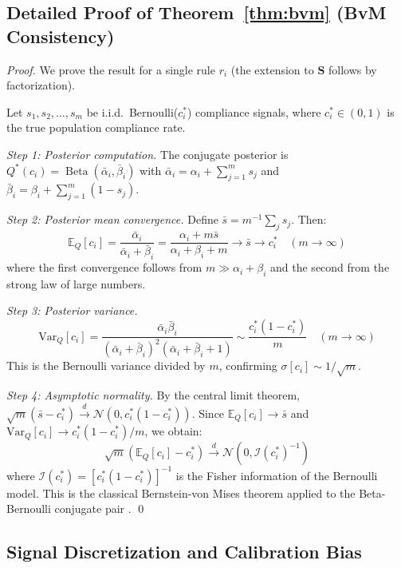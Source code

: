 \subsection{Detailed Proof of Theorem~\ref{thm:bvm} (BvM Consistency)}

\begin{proof}
We prove the result for a single rule $r_i$ (the extension to
$\mathbf{S}$ follows by factorization).

Let $s_1, s_2, \ldots, s_m$ be i.i.d.\ Bernoulli($c_i^*$) compliance
signals, where $c_i^* \in (0,1)$ is the true population compliance rate.

\textit{Step 1: Posterior computation.}
The conjugate posterior is
$Q^*(c_i) = \operatorname{Beta}(\bar{\alpha}_i, \bar{\beta}_i)$ with
$\bar{\alpha}_i = \alpha_i + \sum_{j=1}^m s_j$ and
$\bar{\beta}_i = \beta_i + \sum_{j=1}^m (1-s_j)$.

\textit{Step 2: Posterior mean convergence.}
Define $\bar{s} = m^{-1}\sum_j s_j$. Then:
\[
  \mathbb{E}_Q[c_i] = \frac{\bar{\alpha}_i}{\bar{\alpha}_i + \bar{\beta}_i}
  = \frac{\alpha_i + m\bar{s}}{\alpha_i + \beta_i + m}
  \to \bar{s} \to c_i^* \quad (m \to \infty)
\]
where the first convergence follows from $m \gg \alpha_i + \beta_i$
and the second from the strong law of large numbers.

\textit{Step 3: Posterior variance.}
\[
  \mathrm{Var}_Q[c_i] = \frac{\bar{\alpha}_i \bar{\beta}_i}
  {(\bar{\alpha}_i + \bar{\beta}_i)^2 (\bar{\alpha}_i + \bar{\beta}_i + 1)}
  \sim \frac{c_i^*(1-c_i^*)}{m} \quad (m \to \infty)
\]
This is the Bernoulli variance divided by $m$, confirming
$\sigma[c_i] \sim 1/\sqrt{m}$.

\textit{Step 4: Asymptotic normality.}
By the central limit theorem, $\sqrt{m}(\bar{s} - c_i^*)
\xrightarrow{d} \mathcal{N}(0, c_i^*(1-c_i^*))$. Since
$\mathbb{E}_Q[c_i] \to \bar{s}$ and $\mathrm{Var}_Q[c_i] \to
c_i^*(1-c_i^*)/m$, we obtain:
\[
  \sqrt{m}(\mathbb{E}_Q[c_i] - c_i^*) \xrightarrow{d}
  \mathcal{N}(0, \mathcal{I}(c_i^*)^{-1})
\]
where $\mathcal{I}(c_i^*) = [c_i^*(1-c_i^*)]^{-1}$ is the Fisher
information of the Bernoulli model. This is the classical
Bernstein-von Mises theorem applied to the Beta-Bernoulli conjugate
pair \citep{van2000asymptotic}. \qed
\end{proof}


\subsection{Signal Discretization and Calibration Bias}

